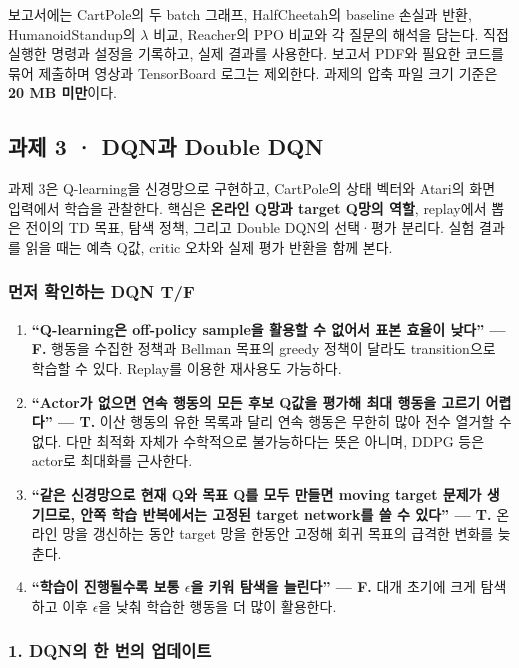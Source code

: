 \documentclass[11pt,a4paper]{article}
\begin{document}
보고서에는 CartPole의 두 batch 그래프, HalfCheetah의 baseline 손실과 반환, HumanoidStandup의 $\lambda$ 비교, Reacher의 PPO 비교와 각 질문의 해석을 담는다. 직접 실행한 명령과 설정을 기록하고, 실제 결과를 사용한다. 보고서 PDF와 필요한 코드를 묶어 제출하며 영상과 TensorBoard 로그는 제외한다. 과제의 압축 파일 크기 기준은 \textbf{20 MB 미만}이다.\par

\clearpage
\subsection{과제 3 · DQN과 Double DQN}


과제 3은 Q-learning을 신경망으로 구현하고, CartPole의 상태 벡터와 Atari의 화면 입력에서 학습을 관찰한다. 핵심은 \textbf{온라인 Q망과 target Q망의 역할}, replay에서 뽑은 전이의 TD 목표, 탐색 정책, 그리고 Double DQN의 선택·평가 분리다. 실험 결과를 읽을 때는 예측 Q값, critic 오차와 실제 평가 반환을 함께 본다.\par

\subsubsection{먼저 확인하는 DQN T/F}

\begin{enumerate}
\item \textbf{“Q-learning은 off-policy sample을 활용할 수 없어서 표본 효율이 낮다” — F.} 행동을 수집한 정책과 Bellman 목표의 greedy 정책이 달라도 transition으로 학습할 수 있다. Replay를 이용한 재사용도 가능하다.
\item \textbf{“Actor가 없으면 연속 행동의 모든 후보 Q값을 평가해 최대 행동을 고르기 어렵다” — T.} 이산 행동의 유한 목록과 달리 연속 행동은 무한히 많아 전수 열거할 수 없다. 다만 최적화 자체가 수학적으로 불가능하다는 뜻은 아니며, DDPG 등은 actor로 최대화를 근사한다.
\item \textbf{“같은 신경망으로 현재 Q와 목표 Q를 모두 만들면 moving target 문제가 생기므로, 안쪽 학습 반복에서는 고정된 target network를 쓸 수 있다” — T.} 온라인 망을 갱신하는 동안 target 망을 한동안 고정해 회귀 목표의 급격한 변화를 늦춘다.
\item \textbf{“학습이 진행될수록 보통 $\epsilon$을 키워 탐색을 늘린다” — F.} 대개 초기에 크게 탐색하고 이후 $\epsilon$을 낮춰 학습한 행동을 더 많이 활용한다.
\end{enumerate}

\subsubsection{1. DQN의 한 번의 업데이트}
\end{document}
